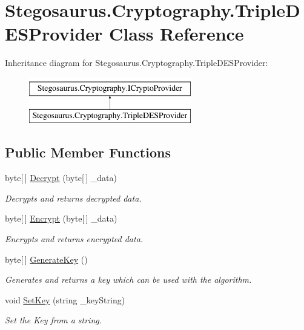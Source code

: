 \hypertarget{class_stegosaurus_1_1_cryptography_1_1_triple_d_e_s_provider}{}\section{Stegosaurus.\+Cryptography.\+Triple\+D\+E\+S\+Provider Class Reference}
\label{class_stegosaurus_1_1_cryptography_1_1_triple_d_e_s_provider}
Inheritance diagram for Stegosaurus.\+Cryptography.\+Triple\+D\+E\+S\+Provider\+:\begin{figure}[H]
\begin{center}
\leavevmode
\includegraphics[height=2.000000cm]{class_stegosaurus_1_1_cryptography_1_1_triple_d_e_s_provider}
\end{center}
\end{figure}
\subsection*{Public Member Functions}
\begin{DoxyCompactItemize}
\item 
byte\mbox{[}$\,$\mbox{]} \hyperlink{class_stegosaurus_1_1_cryptography_1_1_triple_d_e_s_provider_aae9a3eb3f23e3c8995252d6f1184fd70}{Decrypt} (byte\mbox{[}$\,$\mbox{]} \+\_\+data)
\begin{DoxyCompactList}\small\item\em Decrypts and returns decrypted data. \end{DoxyCompactList}\item 
byte\mbox{[}$\,$\mbox{]} \hyperlink{class_stegosaurus_1_1_cryptography_1_1_triple_d_e_s_provider_a3af1ec710220cb696b1266d3317a4e79}{Encrypt} (byte\mbox{[}$\,$\mbox{]} \+\_\+data)
\begin{DoxyCompactList}\small\item\em Encrypts and returns encrypted data. \end{DoxyCompactList}\item 
byte\mbox{[}$\,$\mbox{]} \hyperlink{class_stegosaurus_1_1_cryptography_1_1_triple_d_e_s_provider_a7ed750ce72bf9adf2e35887d0ab67db8}{Generate\+Key} ()
\begin{DoxyCompactList}\small\item\em Generates and returns a key which can be used with the algorithm. \end{DoxyCompactList}\item 
void \hyperlink{class_stegosaurus_1_1_cryptography_1_1_triple_d_e_s_provider_ab7413df54e7753ae7ce4776f94521c7a}{Set\+Key} (string \+\_\+key\+String)
\begin{DoxyCompactList}\small\item\em Set the Key from a string. \end{DoxyCompactList}\end{DoxyCompactItemize}
